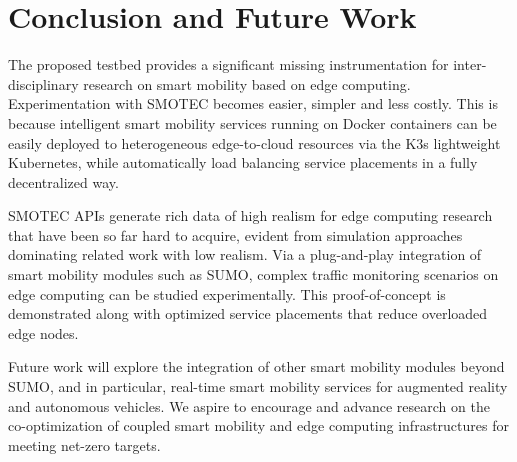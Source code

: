 \documentclass[conference]{IEEEtran}
\begin{document}

\section{Conclusion and Future Work}\label{sec:conclusion}

The proposed testbed provides a significant missing instrumentation for inter-disciplinary research on smart mobility based on edge computing. Experimentation with SMOTEC becomes easier, simpler and less costly. This is because intelligent smart mobility services running on Docker containers can be easily deployed to heterogeneous edge-to-cloud resources via the K3s lightweight Kubernetes, while automatically load balancing service placements in a fully decentralized way. 

SMOTEC APIs generate rich data of high realism for edge computing research that have been so far hard to acquire, evident from simulation approaches dominating related work with low realism. Via a plug-and-play integration of smart mobility modules such as SUMO, complex traffic monitoring scenarios on edge computing can be studied experimentally. This proof-of-concept is demonstrated along with optimized service placements that reduce overloaded edge nodes.

Future work will explore the integration of other smart mobility modules beyond SUMO, and in particular, real-time smart mobility services for augmented reality and autonomous vehicles. We aspire to encourage and advance research on the co-optimization of coupled smart mobility and edge computing infrastructures for meeting net-zero targets. 
\end{document}
